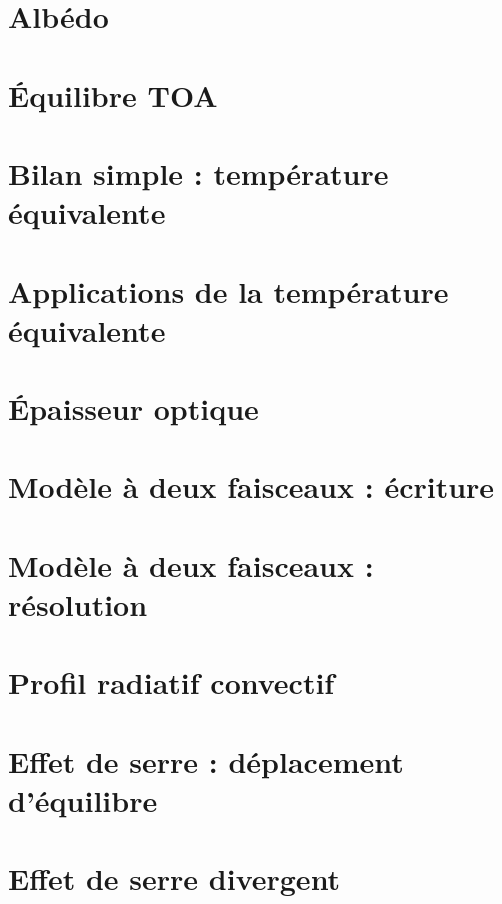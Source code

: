 \documentclass[a4paper,DIV16,10pt]{scrartcl}
\begin{document}
\newpage 
\section{Albédo} 


\newpage
\section{\'Equilibre TOA}


\newpage
\section{Bilan simple : température équivalente}


\newpage
\section{Applications de la température équivalente}


\newpage
\section{\'Epaisseur optique}


\newpage
\section{Modèle à deux faisceaux : écriture}


\newpage
\section{Modèle à deux faisceaux : résolution}


\newpage
\section{Profil radiatif convectif}


\newpage
\section{Effet de serre : déplacement d'équilibre}


\newpage
\section{Effet de serre divergent}

\end{document}
